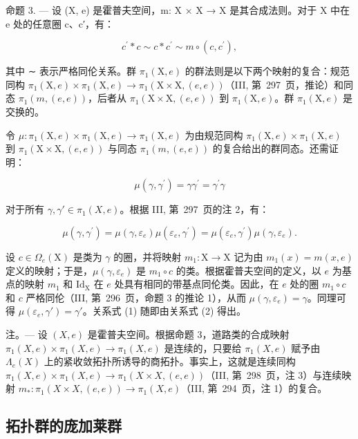 命题 3. — 设 (X, e) 是霍普夫空间，m: X × X → X 是其合成法则。对于 X 中在 e 处的任意圈 c、c′，有：

\[
c ^ {\prime} * c \sim c * c ^ {\prime} \sim m \circ (c, c ^ {\prime}),
\]

其中 ∼ 表示严格同伦关系。群 \(\pi_{1}(\mathrm{X},e)\) 的群法则是以下两个映射的复合：规范同构 \(\pi_{1}(\mathrm{X},e)\times\pi_{1}(\mathrm{X},e)\to\pi_{1}(\mathrm{X}\times\mathrm{X},(e,e))\)（III, 第~297~页，推论）和同态 \(\pi_{1}(m,(e,e))\)，后者从 \(\pi_{1}(\mathrm{X}\times\mathrm{X},(e,e))\) 到 \(\pi_{1}(\mathrm{X},e)\)。群 \(\pi_{1}(\mathrm{X},e)\) 是交换的。

令 \(\mu\colon\pi_{1}(\mathrm{X},e)\times\pi_{1}(\mathrm{X},e)\to\pi_{1}(\mathrm{X},e)\) 为由规范同构 \(\pi_{1}(\mathrm{X},e)\times\pi_{1}(\mathrm{X},e)\) 到 \(\pi_{1}(\mathrm{X}\times\mathrm{X},(e,e))\) 与同态 \(\pi_{1}(m,(e,e))\) 的复合给出的群同态。还需证明：

\[
\mu (\gamma , \gamma^ {\prime}) = \gamma \gamma^ {\prime} = \gamma^ {\prime} \gamma\tag{1}
\]

对于所有 \(\gamma, \gamma' \in \pi_1(X, e)\)。根据 III, 第~297~页的注 2，有：

\[
\mu (\gamma , \gamma^ {\prime}) = \mu (\gamma , \varepsilon_ {e}) \mu (\varepsilon_ {e}, \gamma^ {\prime}) = \mu (\varepsilon_ {e}, \gamma^ {\prime}) \mu (\gamma , \varepsilon_ {e}).\tag{2}
\]

设 \(c \in \Omega_e(\mathrm{X})\) 是类为 \(\gamma\) 的圈，并将映射 \(m_1 \colon \mathrm{X} \to \mathrm{X}\) 记为由 \(m_1(x) = m(x, e)\) 定义的映射；于是，\(\mu(\gamma, \varepsilon_e)\) 是 \(m_1 \circ c\) 的类。根据霍普夫空间的定义，以 \(e\) 为基点的映射 \(m_1\) 和 \(\mathrm{Id_X}\) 在 \(e\) 处具有相同的带基点同伦类。因此，在 \(e\) 处的圈 \(m_1 \circ c\) 和 \(c\) 严格同伦（III, 第~296~页，命题 3 的推论 1），从而 \(\mu(\gamma, \varepsilon_e) = \gamma\)。同理可得 \(\mu(\varepsilon_e, \gamma') = \gamma'\)。关系式 (1) 随即由关系式 (2) 得出。

注。--- 设 \((X,e)\) 是霍普夫空间。根据命题 3，道路类的合成映射 \(\pi_{1}(X,e)\times\pi_{1}(X,e)\to\pi_{1}(X,e)\) 是连续的，只要给 \(\pi_{1}(X,e)\) 赋予由 \(\Lambda_{e}(X)\) 上的紧收敛拓扑所诱导的商拓扑。事实上，这就是连续同构 \(\pi_{1}(X,e)\times\pi_{1}(X,e)\to\pi_{1}(X\times X,(e,e))\)（III, 第~298~页，注 3）与连续映射 \(m_{*}:\pi_{1}(X\times X,(e,e))\to\pi_{1}(X,e)\)（III, 第~294~页，注 1）的复合。

\subsection{拓扑群的庞加莱群}

